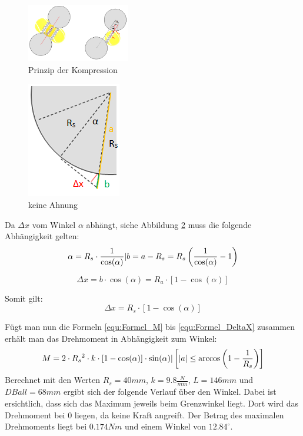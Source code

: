 \begin{figure}[h!]
	\centering
	\includegraphics[width=0.4\textwidth]{Enddokumentation/Anhang/Bilder/PrinzipKompression.png}
	\caption{Prinzip der Kompression}
	\label{fig:PrinzipBallKomp}
\end{figure}

\begin{figure}
    \includegraphics[scale=0.75]{Enddokumentation/Anhang/Bilder/GrafikKreisErkaerung.png}
    \centering
    \caption{keine Ahnung}
    \label{abb:KreisErkaerung}
    \vspace{5mm}
\end{figure}
Da $\Delta x$ vom Winkel $\alpha$ abhängt, siehe Abbildung \ref{abb:KreisErkaerung} muss die
folgende Abhängigkeit gelten:
\begin{equation}  
	\alpha = R_s \cdot \frac{1}{\cos(\alpha)} \\ \lvert \\ b = a - R_s = R_s \left( \frac{1}{\cos(\alpha)}-1\right)   
\end{equation}

\begin{equation}
	\Delta x = b \cdot \cos(\alpha) = R_a \cdot \left[1 - \cos(\alpha)\right]
\end{equation}

Somit gilt:
\begin{equation} 	\Delta x =  R_s \cdot \left[1 - \cos(\alpha)\right]
	\label{equ:Formel_DeltaX}
\end{equation}

Fügt man nun die Formeln \ref{equ:Formel_M} bis \ref{equ:Formel_DeltaX} zusammen erhält man
das Drehmoment in Abhängigkeit zum Winkel:
\begin{equation}  
    M = 2 \cdot R_s{^{2}} \cdot k \cdot \left[1 - \cos(\alpha)\right] \cdot \sin(\alpha)\\\lvert\\ \left[ |a| \leq \arccos \left(1-\frac{1}{R_s}\right)\right]
\end{equation}
Berechnet mit den Werten $R_s = 40 mm$, $k = 9.8 \frac{N}{mm}$, $L = 146 mm$ und
$DBall = 68 mm$ ergibt sich der folgende Verlauf über den Winkel. Dabei ist ersichtlich,
dass sich das Maximum jeweils beim Grenzwinkel liegt. Dort wird das Drehmoment bei 0 liegen,
da keine Kraft angreift. Der Betrag des maximalen Drehmoments liegt bei $0.174 Nm$ und einem
Winkel von $12.84^\circ$.

